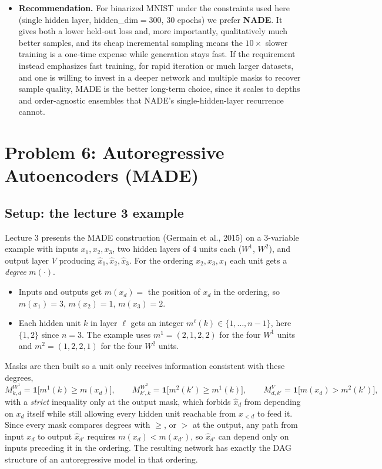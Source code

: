 \documentclass[11pt]{article}
\begin{document}
\begin{itemize}
  should therefore be read as a strong, structurally suited NADE against a
  \emph{minimal} MADE, not as a general verdict against MADE's architecture
  family.
  \item \textbf{Recommendation.} For binarized MNIST under the constraints used
  here (single hidden layer, hidden\_dim$=300$, $30$ epochs) we prefer
  \textbf{NADE}. It gives both a lower held-out loss and, more importantly,
  qualitatively much better samples, and its cheap incremental sampling means
  the $10\times$ slower training is a one-time expense while generation stays
  fast. If the requirement instead emphasizes fast training, for rapid
  iteration or much larger datasets, and one is willing to invest in a deeper
  network and multiple masks to recover sample quality, MADE is the better
  long-term choice, since it scales to depths and order-agnostic ensembles that
  NADE's single-hidden-layer recurrence cannot.
\end{itemize}
\newpage
\section{Problem 6: Autoregressive Autoencoders (MADE)}

\subsection*{Setup: the lecture 3 example}

Lecture 3 presents the MADE construction (Germain et al., 2015) on a
3-variable example with inputs $x_1, x_2, x_3$, two hidden layers of $4$ units
each ($W^1$, $W^2$), and output layer $V$ producing
$\hat x_1, \hat x_2, \hat x_3$. For the ordering $x_2, x_3, x_1$ each unit gets
a \emph{degree} $m(\cdot)$.

\begin{itemize}
  \item Inputs and outputs get $m(x_d) = $ the position of $x_d$ in the
  ordering, so $m(x_1)=3$, $m(x_2)=1$, $m(x_3)=2$.
  \item Each hidden unit $k$ in layer $\ell$ gets an integer
  $m^\ell(k) \in \{1,\dots,n-1\}$, here $\{1,2\}$ since $n=3$. The example uses
  $m^1 = (2,1,2,2)$ for the four $W^1$ units and $m^2=(1,2,2,1)$ for the four
  $W^2$ units.
\end{itemize}

Masks are then built so a unit only receives information consistent with these
degrees,
\[
  M^{W^1}_{k,d} = \mathbf{1}\big[m^1(k) \ge m(x_d)\big], \qquad
  M^{W^2}_{k',k} = \mathbf{1}\big[m^2(k') \ge m^1(k)\big], \qquad
  M^{V}_{d,k'} = \mathbf{1}\big[m(x_d) > m^2(k')\big],
\]
with a \emph{strict} inequality only at the output mask, which forbids
$\hat x_d$ from depending on $x_d$ itself while still allowing every hidden unit
reachable from $x_{<d}$ to feed it. Since every mask compares degrees with
$\ge$, or $>$ at the output, any path from input $x_d$ to output $\hat x_{d'}$
requires $m(x_d) < m(x_{d'})$, so $\hat x_{d'}$ can depend only on inputs
preceding it in the ordering. The resulting network has exactly the DAG
structure of an autoregressive model in that ordering.
\end{document}
